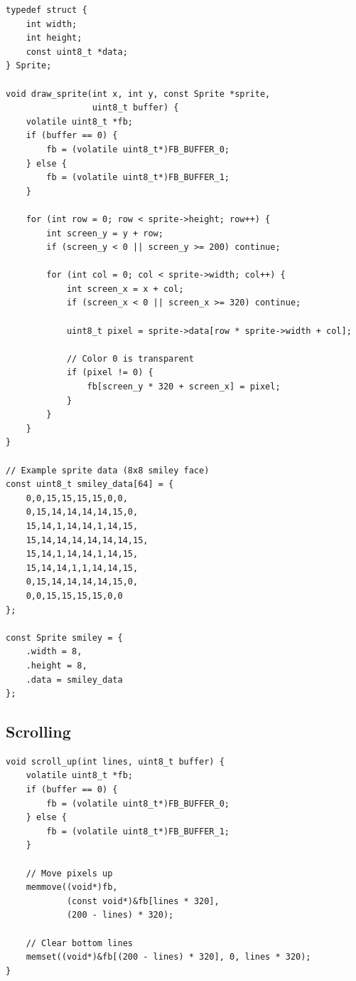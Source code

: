 \documentclass[11pt,letterpaper]{report}
\begin{document}
\begin{lstlisting}[style=c,caption={Sprite Rendering with Transparency}]
typedef struct {
    int width;
    int height;
    const uint8_t *data;
} Sprite;

void draw_sprite(int x, int y, const Sprite *sprite, 
                 uint8_t buffer) {
    volatile uint8_t *fb;
    if (buffer == 0) {
        fb = (volatile uint8_t*)FB_BUFFER_0;
    } else {
        fb = (volatile uint8_t*)FB_BUFFER_1;
    }
    
    for (int row = 0; row < sprite->height; row++) {
        int screen_y = y + row;
        if (screen_y < 0 || screen_y >= 200) continue;
        
        for (int col = 0; col < sprite->width; col++) {
            int screen_x = x + col;
            if (screen_x < 0 || screen_x >= 320) continue;
            
            uint8_t pixel = sprite->data[row * sprite->width + col];
            
            // Color 0 is transparent
            if (pixel != 0) {
                fb[screen_y * 320 + screen_x] = pixel;
            }
        }
    }
}

// Example sprite data (8x8 smiley face)
const uint8_t smiley_data[64] = {
    0,0,15,15,15,15,0,0,
    0,15,14,14,14,14,15,0,
    15,14,1,14,14,1,14,15,
    15,14,14,14,14,14,14,15,
    15,14,1,14,14,1,14,15,
    15,14,14,1,1,14,14,15,
    0,15,14,14,14,14,15,0,
    0,0,15,15,15,15,0,0
};

const Sprite smiley = {
    .width = 8,
    .height = 8,
    .data = smiley_data
};
\end{lstlisting}

\subsection{Scrolling}

\begin{lstlisting}[style=c,caption={Vertical Scrolling}]
void scroll_up(int lines, uint8_t buffer) {
    volatile uint8_t *fb;
    if (buffer == 0) {
        fb = (volatile uint8_t*)FB_BUFFER_0;
    } else {
        fb = (volatile uint8_t*)FB_BUFFER_1;
    }
    
    // Move pixels up
    memmove((void*)fb, 
            (const void*)&fb[lines * 320], 
            (200 - lines) * 320);
    
    // Clear bottom lines
    memset((void*)&fb[(200 - lines) * 320], 0, lines * 320);
}
\end{lstlisting}
\end{document}
